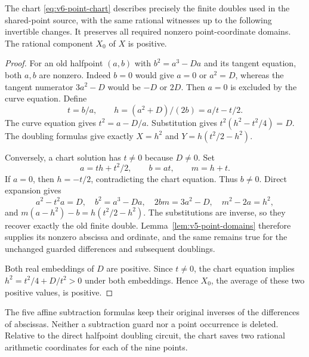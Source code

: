 \begin{lemma}\label{lem:v6-point-chart}
The chart \eqref{eq:v6-point-chart} describes precisely the finite doubles
used in the shared-point source, with the same rational witnesses up to
the following invertible changes. It preserves all required nonzero
point-coordinate domains. The rational component $X_0$ of $X$ is positive.
\end{lemma}
\begin{proof}
For an old halfpoint $(a,b)$ with $b^2=a^3-Da$ and its tangent equation,
both $a,b$ are nonzero. Indeed $b=0$ would give $a=0$ or $a^2=D$,
whereas the tangent numerator $3a^2-D$ would be $-D$ or $2D$. Then
$a=0$ is excluded by the curve equation. Define
\[
 t=b/a,\qquad h=(a^2+D)/(2b)=a/t-t/2.
\]
The curve equation gives $t^2=a-D/a$. Substitution gives
$t^2(h^2-t^2/4)=D$. The doubling formulas give exactly $X=h^2$
and $Y=h(t^2/2-h^2)$.

Conversely, a chart solution has $t\ne0$ because $D\ne0$. Set
\[
 a=th+t^2/2,\qquad b=at,\qquad m=h+t.
\]
If $a=0$, then $h=-t/2$, contradicting the chart equation. Thus $b\ne0$.
Direct expansion gives
\[
 a^2-t^2a=D,\quad b^2=a^3-Da,\quad
 2bm=3a^2-D,\quad m^2-2a=h^2,
\]
and $m(a-h^2)-b=h(t^2/2-h^2)$. The substitutions are inverse, so they
recover exactly the old finite double. Lemma~\ref{lem:v5-point-domains}
therefore supplies its nonzero abscissa and ordinate, and the same remains
true for the unchanged guarded differences and subsequent doublings.

Both real embeddings of $D$ are positive. Since $t\ne0$, the chart
equation implies $h^2=t^2/4+D/t^2>0$ under both embeddings. Hence
$X_0$, the average of these two positive values, is positive.
\end{proof}

The five affine subtraction formulas keep their original inverses of
the differences of abscissas. Neither a subtraction guard nor a point
occurrence is deleted. Relative to the direct halfpoint doubling circuit,
the chart saves two rational arithmetic coordinates for each of the nine
points.

